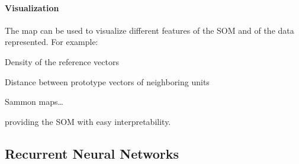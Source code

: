 \documentclass[10pt]{report}
\begin{document}
\paragraph{Visualization} The map can be used to visualize different features of the SOM and of the data represented. For example:
\begin{list}{}{}
	\item Density of the reference vectors
	\item Distance between prototype vectors of neighboring units
	\item Sammon maps\ldots
\end{list}
providing the SOM with easy interpretability.
\subsection{Recurrent Neural Networks}
\end{document}
